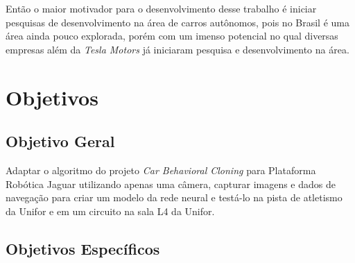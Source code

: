 Então o maior motivador para o desenvolvimento desse trabalho é iniciar pesquisas de desenvolvimento na área de carros autônomos, pois no Brasil é uma área ainda pouco explorada, porém com um imenso potencial no qual diversas empresas além da \textit{Tesla Motors} \cite{empresasenvolvidascomcarrosautonomos} já iniciaram pesquisa e desenvolvimento na área.

\section{Objetivos}
\label{sec:objetivos}

\subsection{Objetivo Geral}
\label{sec:objetivo-geral}

Adaptar o algoritmo do projeto \textit{Car Behavioral Cloning} para Plataforma Robótica Jaguar utilizando apenas uma câmera, capturar imagens e dados de navegação para criar um modelo da rede neural e testá-lo na pista de atletismo da Unifor e em um circuito na sala L4 da Unifor.

\subsection{Objetivos Específicos}
\label{sec:objetivos-especificos}






